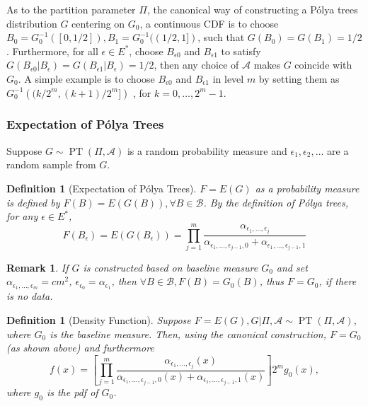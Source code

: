 \documentclass[12pt]{article}
\newtheorem{deff}[thm]{Definition}
\newtheorem{rmk}[thm]{Remark}
\newcommand{\polya}{P\'{o}lya}
\DeclareMathOperator{\pt}{PT}
\begin{document}
As to the partition parameter $\Pi$, the canonical way of constructing
a \polya{} trees distribution $G$ centering on $G_0$, a continuous CDF
is to choose $B_0 = G^{-1}_0 ([0, 1/2]), B_1 = G^{-1}_0 ((1/2,1])$,
such that $G(B_0) = G(B_1)= 1/2$. Furthermore, for all $\epsilon \in
E^{*}$, choose $B_{\epsilon 0 }$ and $B_{\epsilon 1}$ to satisfy 
$G(B_{\epsilon 0 } |B_{\epsilon} ) = G(B_{\epsilon 1} | B_{\epsilon})
= 1/2 $, then any choice of $\mathcal{A} $ makes $G$ coincide with
$G_0$. A simple example is to choose $B_{\epsilon 0} $ and
$B_{\epsilon 1}$ in level $m$ by setting them as $G^{-1}_0 \left(
  (k/2^m, (k+1)/2^m] \right)$ , for $k=0, \ldots, 2^m-1$. 

\subsubsection{Expectation of \polya{} Trees}
Suppose $G \sim \pt (\Pi, \mathcal{A})$ is a random probability
measure and $\epsilon_1, \epsilon_2, \ldots$ are a random sample from $G$. 

\begin{deff}[Expectation of \polya{} Trees]
$F= E(G)$ as a probability measure is defined by $F(B) = E(G(B)),
\forall B \in \mathcal{B}$. By the definition of \polya{} trees, for any
$\epsilon \in E^{*}$, 
\begin{displaymath}
F(B_{\epsilon})  = E(G(B_{\epsilon})) = \prod_{j=1}^m
\frac{\alpha_{\epsilon_1, \ldots, \epsilon_j}}{\alpha_{\epsilon_1,
    \ldots, \epsilon_{j-1},0} + \alpha_{\epsilon_1, \ldots, \epsilon_{j-1},1}}
\end{displaymath}
\end{deff}

\begin{rmk}
If $G$ is constructed based on baseline measure $G_0$ and set
$\alpha_{\epsilon_1, \ldots, \epsilon_m} = cm^2 $,
$\epsilon_{\epsilon_0 }= \alpha_{\epsilon_1}$, then $\forall B \in
\mathcal{B}, F(B) = G_0(B)$, thus $F=G_0$, if there is no
data.
\end{rmk}

\begin{deff}[Density Function]
Suppose $F=E(G), G|\Pi, \mathcal{A} \sim \pt (\Pi, \mathcal{A})$,
where $G_0 $ is the baseline measure. Then, using the canonical
construction, $F=G_0$ (as shown above) and furthermore 
\begin{equation}\label{eq:3}
f(x) = \left[ \prod_{j=1}^m \frac{ \alpha_{\epsilon_1, \ldots,
      \epsilon_j}(x)}{\alpha_{\epsilon_1, \ldots, \epsilon_{j-1},0}(x)
   + \alpha_{\epsilon_1, \ldots, \epsilon_{j-1},1}(x)} \right] 2^{m } g_0(x),
\end{equation}
where $g_0$ is the pdf of $G_0$. 
\end{deff}
\end{document}
